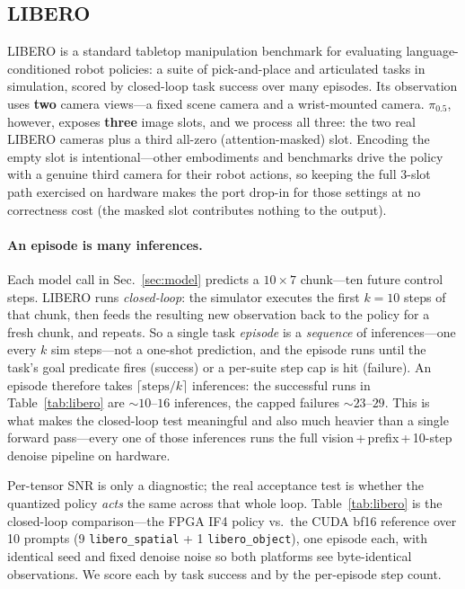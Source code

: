 \documentclass[11pt]{article}
\newcommand{\pizero}{$\pi_{0.5}$}
\newcommand{\iffour}{IF4}
\newcommand{\bfteen}{bf16}
\begin{document}
\subsection{LIBERO}
\label{sec:libero}
LIBERO is a standard tabletop manipulation benchmark for evaluating
language-conditioned robot policies: a suite of pick-and-place and articulated
tasks in simulation, scored by closed-loop task success over many episodes. Its
observation uses \textbf{two} camera views---a fixed scene camera and a
wrist-mounted camera. \pizero{}, however, exposes \textbf{three} image slots, and
we process all three: the two real LIBERO cameras plus a third all-zero
(attention-masked) slot. Encoding the empty slot is intentional---other
embodiments and benchmarks drive the policy with a genuine third camera for their
robot actions, so keeping the full 3-slot path exercised on hardware makes the
port drop-in for those settings at no correctness cost (the masked slot
contributes nothing to the output).

\paragraph{An episode is many inferences.} Each model call in
Sec.~\ref{sec:model} predicts a $10{\times}7$ chunk---ten future control
steps. LIBERO runs \emph{closed-loop}: the simulator executes the first
$k{=}10$ steps of that chunk, then feeds the resulting new observation back to
the policy for a fresh chunk, and repeats. So a single task \emph{episode} is a
\emph{sequence} of inferences---one every $k$ sim steps---not a one-shot
prediction, and the episode runs until the task's goal predicate fires (success)
or a per-suite step cap is hit (failure). An episode therefore takes
$\lceil \text{steps}/k \rceil$ inferences: the successful runs in
Table~\ref{tab:libero} are $\sim$$10$--$16$ inferences, the capped failures
$\sim$$23$--$29$. This is what makes the closed-loop test meaningful and also
much heavier than a single forward pass---every one of those inferences runs the
full vision\,+\,prefix\,+\,10-step denoise pipeline on hardware.

Per-tensor SNR is only a diagnostic; the real acceptance test is whether the
quantized policy \emph{acts} the same across that whole loop.
Table~\ref{tab:libero} is the closed-loop comparison---the FPGA \iffour{} policy
vs.\ the CUDA \bfteen{} reference over 10 prompts (9 \texttt{libero\_spatial}
+ 1 \texttt{libero\_object}), one episode each, with identical seed and fixed
denoise noise so both platforms see byte-identical observations. We score each by
task success and by the per-episode step count.
\end{document}
